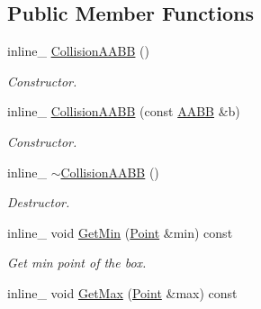 \subsection*{Public Member Functions}
\begin{DoxyCompactItemize}
\item 
inline\+\_\+ \hyperlink{classCollisionAABB_af906906c07792fd4206d6acc58ebb514}{Collision\+A\+A\+BB} ()\hypertarget{classCollisionAABB_af906906c07792fd4206d6acc58ebb514}{}\label{classCollisionAABB_af906906c07792fd4206d6acc58ebb514}

\begin{DoxyCompactList}\small\item\em Constructor. \end{DoxyCompactList}\item 
inline\+\_\+ \hyperlink{classCollisionAABB_ada0c6c5a1c80b46156c965e56b752fbc}{Collision\+A\+A\+BB} (const \hyperlink{classAABB}{A\+A\+BB} \&b)\hypertarget{classCollisionAABB_ada0c6c5a1c80b46156c965e56b752fbc}{}\label{classCollisionAABB_ada0c6c5a1c80b46156c965e56b752fbc}

\begin{DoxyCompactList}\small\item\em Constructor. \end{DoxyCompactList}\item 
inline\+\_\+ \hyperlink{classCollisionAABB_a61df95f9c6f7eccd172efaeadc780ba2}{$\sim$\+Collision\+A\+A\+BB} ()\hypertarget{classCollisionAABB_a61df95f9c6f7eccd172efaeadc780ba2}{}\label{classCollisionAABB_a61df95f9c6f7eccd172efaeadc780ba2}

\begin{DoxyCompactList}\small\item\em Destructor. \end{DoxyCompactList}\item 
inline\+\_\+ void \hyperlink{classCollisionAABB_a5084b74e57fa1af3a24046393cc40927}{Get\+Min} (\hyperlink{classPoint}{Point} \&min) const \hypertarget{classCollisionAABB_a5084b74e57fa1af3a24046393cc40927}{}\label{classCollisionAABB_a5084b74e57fa1af3a24046393cc40927}

\begin{DoxyCompactList}\small\item\em Get min point of the box. \end{DoxyCompactList}\item 
inline\+\_\+ void \hyperlink{classCollisionAABB_a3a6017937a77b1f2b0c85ef65e4e2b68}{Get\+Max} (\hyperlink{classPoint}{Point} \&max) const \hypertarget{classCollisionAABB_a3a6017937a77b1f2b0c85ef65e4e2b68}{}\label{classCollisionAABB_a3a6017937a77b1f2b0c85ef65e4e2b68}


\end{DoxyCompactItemize}
